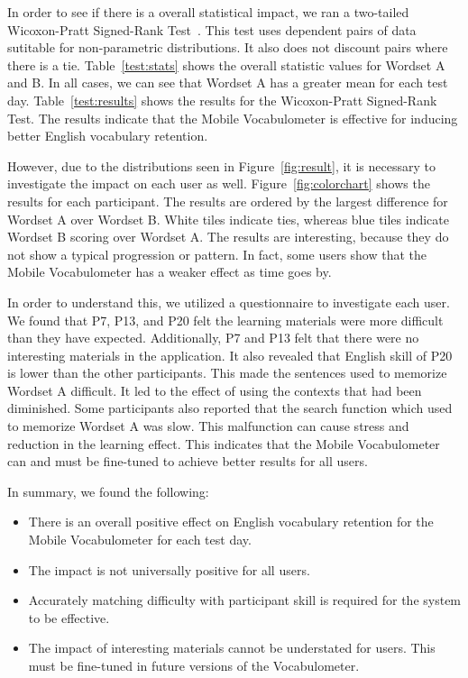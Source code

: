 \documentclass[sigchi]{acmart}
\begin{document}
In order to see if there is a overall statistical impact, we ran a two-tailed Wicoxon-Pratt Signed-Rank Test~\cite{pratt1959remarks}. This test uses dependent pairs of data sutitable for non-parametric distributions. It also does not discount pairs where there is a tie. Table~\ref{test:stats} shows the overall statistic values for Wordset A and B. In all cases, we can see that Wordset A has a greater mean for each test day. Table~\ref{test:results} shows the results for the Wicoxon-Pratt Signed-Rank Test. The results indicate that the Mobile Vocabulometer is effective for inducing better English vocabulary retention. 

However, due to the distributions seen in Figure~\ref{fig:result}, it is necessary to investigate the impact on each user as well. Figure~\ref{fig:colorchart} shows the results for each participant. The results are ordered by the largest difference for Wordset A over Wordset B. White tiles indicate ties, whereas blue tiles indicate Wordset B scoring over Wordset A. The results are interesting, because they do not show a typical progression or pattern. In fact, some users show that the Mobile Vocabulometer has a weaker effect as time goes by. 


In order to understand this, we utilized a questionnaire to investigate each user. We found that P7, P13, and P20 felt the learning materials were more difficult than they have expected. Additionally, P7 and P13 felt that there were no interesting materials in the application. It also revealed that English skill of P20 is lower than the other participants. This made the sentences used to memorize Wordset A difficult. It led to the effect of using the contexts that had been diminished. Some participants also reported that the search function which used to memorize Wordset A was slow. This malfunction can cause stress and reduction in the learning effect. This indicates that the Mobile Vocabulometer can and must be fine-tuned to achieve better results for all users.

In summary, we found the following: 

\begin{itemize}
    \item There is an overall positive effect on English vocabulary retention for the Mobile Vocabulometer for each test day. 
    \item The impact is not universally positive for all users. 
    \item Accurately matching difficulty with participant skill is required for the system to be effective. 
    \item The impact of interesting materials cannot be understated for users. This must be fine-tuned in future versions of the Vocabulometer.
    \end{itemize}
\end{document}
